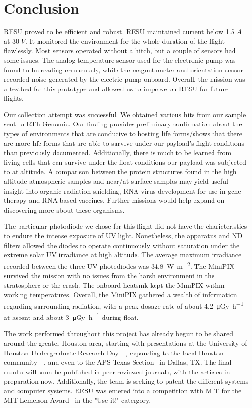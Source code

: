\section{Conclusion}
\label{sec:Conclusion}

RESU proved to be efficient and robust.  RESU maintained current below 1.5 $A$ at 30 $V$.  It monitored the environment for the whole duration of the flight flawlessly.  Most sensors operated without a hitch, but a couple of sensors had some issues. The analog temperature sensor used for the electronic pump was found to be reading erroneously, while the magnetometer and orientation sensor recorded noise generated by the electric pump onboard.  Overall, the mission was a testbed for this prototype and allowed us to improve on RESU for future flights.

Our collection attempt was successful. We obtained various hits from our sample sent to RTL Genomic. Our finding provides preliminary confirmation about the types of environments that are conducive to hosting life forms/shows that there are more life forms that are able to survive under our payload’s flight conditions than previously documented. Additionally, there is much to be learned from living cells that can survive under the float conditions our payload was subjected to at altitude. A comparison between the protein structures found in the high altitude atmospheric samples and near/at surface samples may yield useful insight into organic radiation shielding, RNA virus development for use in gene therapy and RNA-based vaccines. Further  missions would help expand on discovering more about these organisms. 

The particular photodiode we chose for this flight did not have the charicteristics to endure the intense exposure of UV light. Nonetheless, the apparatus and ND filters allowed the diodes to operate continuously without saturation under the extreme solar UV irradiance at high altitude. The average maximum irradiance recorded between the three UV photodiodes was \SI{34.8}{\watt\per\meter\squared}. The MiniPIX survived the mission with no issues from the harsh environment in the stratosphere or the crash. The onboard heatsink kept the MiniPIX within working temperatures. Overall, the MiniPIX gathered a wealth of information regarding surrounding radiation, with a peak dosage rate of about \SI{4.2}{\micro\gray\per\hour} at ascent and about \SI{3}{\micro\gray\per\hour} during float.

The work performed throughout this project has already begun to be shared around the greater Houston area, starting with presentations at the University of Houston Undergraduate Research Day~\cite{SamURD}~\cite{StevenURD}, expanding to the local Houston community~\citep{StevenSchoolPres}~\cite{Fre}, and even to the APS Texas Section~\cite{SamAPS} in Dallas, TX.  The final results will soon be published in peer reviewed journals, with the articles in preparation now.  Additionally, the team is seeking to patent the different systems and computer systems.  RESU was entered into a competition with MIT for the MIT-Lemelson Award~\cite{MIT} in the "Use it!" catergory. %
